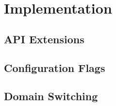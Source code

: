 \section{Implementation}
\label{sec:implementation}


\subsection{API Extensions}
\label{sub:api}


\subsection{Configuration Flags}
\label{sub:config}


\subsection{Domain Switching}
\label{sub:domain_switching}

